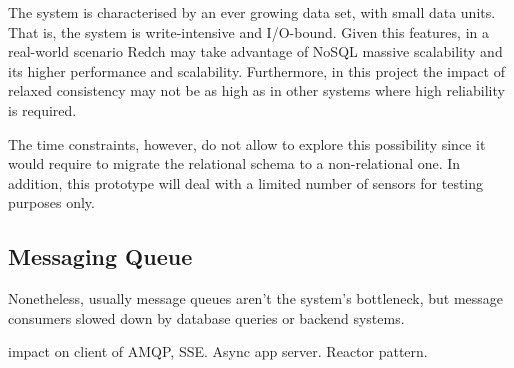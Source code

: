 The system is characterised by an ever growing data set, with small data units. That is, the system is write-intensive and I/O-bound. Given this features, in a real-world scenario Redch may take advantage of NoSQL massive scalability and its higher performance and scalability. Furthermore, in this project the impact of relaxed consistency may not be as high as in other systems where high reliability is required.

The time constraints, however, do not allow to explore this possibility since it would require to migrate the relational schema to a non-relational one. In addition, this prototype will deal with a limited number of sensors for testing purposes only.

\subsection{Messaging Queue}

Nonetheless, usually message queues aren't the system's bottleneck, but message consumers slowed down by database queries or backend systems.

impact on client of AMQP, SSE. Async app server. Reactor pattern.
